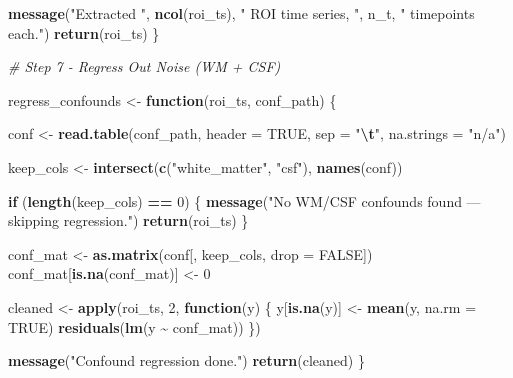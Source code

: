\documentclass[
]{article}
\newenvironment{Shaded}{\begin{snugshade}}{\end{snugshade}}
\newcommand{\AttributeTok}[1]{\textcolor[rgb]{0.13,0.29,0.53}{#1}}
\newcommand{\CommentTok}[1]{\textcolor[rgb]{0.56,0.35,0.01}{\textit{#1}}}
\newcommand{\ConstantTok}[1]{\textcolor[rgb]{0.56,0.35,0.01}{#1}}
\newcommand{\ControlFlowTok}[1]{\textcolor[rgb]{0.13,0.29,0.53}{\textbf{#1}}}
\newcommand{\DecValTok}[1]{\textcolor[rgb]{0.00,0.00,0.81}{#1}}
\newcommand{\FunctionTok}[1]{\textcolor[rgb]{0.13,0.29,0.53}{\textbf{#1}}}
\newcommand{\NormalTok}[1]{#1}
\newcommand{\OtherTok}[1]{\textcolor[rgb]{0.56,0.35,0.01}{#1}}
\newcommand{\SpecialCharTok}[1]{\textcolor[rgb]{0.81,0.36,0.00}{\textbf{#1}}}
\newcommand{\StringTok}[1]{\textcolor[rgb]{0.31,0.60,0.02}{#1}}
\begin{document}
\begin{Shaded}
\begin{Highlighting}[]
  \FunctionTok{message}\NormalTok{(}\StringTok{"Extracted "}\NormalTok{, }\FunctionTok{ncol}\NormalTok{(roi\_ts), }\StringTok{" ROI time series, "}\NormalTok{, n\_t, }\StringTok{" timepoints each."}\NormalTok{)}
  \FunctionTok{return}\NormalTok{(roi\_ts)}
\NormalTok{\}}
\end{Highlighting}
\end{Shaded}

\begin{Shaded}
\begin{Highlighting}[]
\CommentTok{\# Step 7 {-} Regress Out Noise (WM + CSF)}

\NormalTok{regress\_confounds }\OtherTok{\textless{}{-}} \ControlFlowTok{function}\NormalTok{(roi\_ts, conf\_path) \{}

\NormalTok{  conf }\OtherTok{\textless{}{-}} \FunctionTok{read.table}\NormalTok{(conf\_path, }\AttributeTok{header =} \ConstantTok{TRUE}\NormalTok{, }\AttributeTok{sep =} \StringTok{"}\SpecialCharTok{\textbackslash{}t}\StringTok{"}\NormalTok{, }\AttributeTok{na.strings =} \StringTok{"n/a"}\NormalTok{)}

\NormalTok{  keep\_cols }\OtherTok{\textless{}{-}} \FunctionTok{intersect}\NormalTok{(}\FunctionTok{c}\NormalTok{(}\StringTok{"white\_matter"}\NormalTok{, }\StringTok{"csf"}\NormalTok{), }\FunctionTok{names}\NormalTok{(conf))}

  \ControlFlowTok{if}\NormalTok{ (}\FunctionTok{length}\NormalTok{(keep\_cols) }\SpecialCharTok{==} \DecValTok{0}\NormalTok{) \{}
    \FunctionTok{message}\NormalTok{(}\StringTok{"No WM/CSF confounds found — skipping regression."}\NormalTok{)}
    \FunctionTok{return}\NormalTok{(roi\_ts)}
\NormalTok{  \}}

\NormalTok{  conf\_mat }\OtherTok{\textless{}{-}} \FunctionTok{as.matrix}\NormalTok{(conf[, keep\_cols, }\AttributeTok{drop =} \ConstantTok{FALSE}\NormalTok{])}
\NormalTok{  conf\_mat[}\FunctionTok{is.na}\NormalTok{(conf\_mat)] }\OtherTok{\textless{}{-}} \DecValTok{0}

\NormalTok{  cleaned }\OtherTok{\textless{}{-}} \FunctionTok{apply}\NormalTok{(roi\_ts, }\DecValTok{2}\NormalTok{, }\ControlFlowTok{function}\NormalTok{(y) \{}
\NormalTok{    y[}\FunctionTok{is.na}\NormalTok{(y)] }\OtherTok{\textless{}{-}} \FunctionTok{mean}\NormalTok{(y, }\AttributeTok{na.rm =} \ConstantTok{TRUE}\NormalTok{)}
    \FunctionTok{residuals}\NormalTok{(}\FunctionTok{lm}\NormalTok{(y }\SpecialCharTok{\textasciitilde{}}\NormalTok{ conf\_mat))}
\NormalTok{  \})}

  \FunctionTok{message}\NormalTok{(}\StringTok{"Confound regression done."}\NormalTok{)}
  \FunctionTok{return}\NormalTok{(cleaned)}
\NormalTok{\}}
\end{Highlighting}
\end{Shaded}
\end{document}
